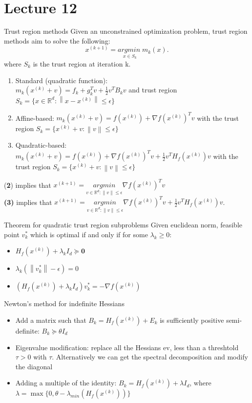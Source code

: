 \documentclass[a4paper]{article}
\begin{document}
\section{Lecture 12}
\begin{subbox}{Trust region methods}
    Given an unconstrained optimization problem, trust region methods aim to solve the following:
    \[
    x^{(k+1)} = \underset{x\in S_k}{argmin \;} m_k(x)
    .\] where $S_k$ is the trust region at iteration k.  
\end{subbox}
\begin{enumerate}
    \item Standard (quadratic function):\\
    $m_k(x^{(k)} + v) = f_k + g_k^Tv + \frac{1}{2}v^T B_k v$ and trust region $S_k = \{x\in \mathbb{R}^d : \left\lVert x-x^{(k)}\right\rVert \leq \epsilon \}$
    \item Affine-based: $m_k(x^{(k)} + v) = f(x^{(k)}) + \nabla f(x^{(k)})^T v$ with the trust region $S_k = \{x^{(k)} + v: \left\lVert v\right\rVert \leq \epsilon \}$ 
    \item Quadratic-based: $m_k(x^{(k)} + v) = f(x^{(k)}) + \nabla f(x^{(k)})^T v + \frac{1}{2}v^T H_f(x^{(k)})v$ with the trust region $S_k = \{x^{(k)} + v: \left\lVert v\right\rVert \leq \epsilon \}$
\end{enumerate}
(\textbf{2}) implies that $x^{(k+1)} = \underset{v\in \mathbb{R}^d: \left\lVert v\right\rVert \leq \epsilon}{argmin}
\nabla f(x^{(k)})^Tv$\\ 
\textbf{(3)}  implies that $x^{(k+1)} = \underset{v\in \mathbb{R}^d: \left\lVert v\right\rVert \leq \epsilon}{argmin} \nabla f(x^{(k)})^T v + \frac{1}{2}v^T H_f(x^{(k)})v $. 

\begin{mainbox}{Theorem for quadratic trust region subproblems}
    Given euclidean norm, feasible point $v_k^*$ which is optimal if and only if for some $\lambda_k \geq 0:$
    \begin{itemize}
        \item $H_f(x^{(k)}) + \lambda_k I_d \succeq \textbf{0} $
        \item $\lambda_k(\left\lVert v_k^*\right\rVert - \epsilon) = 0$
        \item $(H_f(x^{(k)}) + \lambda_k I_d)v_k^* = -\nabla f(x^{(k)})$  
    \end{itemize}
\end{mainbox}

\begin{mainbox}{Newton's method for indefinite Hessians}
    \begin{itemize}
    \item Add a matrix such that $B_k = H_f(x^{(k)}) + E_k$ is sufficiently positive semi-definite: $B_k \succeq \theta I_d$ 
    \item Eigenvalue modification: replace all the Hessians ev, less than a threshtold $\tau > 0$ with $\tau$. Alternatively we can get the spectral decomposition and modify the diagonal
    \item Adding a multiple of the identity: $B_k = H_f(x^{(k)}) + \lambda I_d$, where $\lambda = \max\{0, \theta-\lambda_{min}(H_f(x^{(k)}))\}$  
    \end{itemize}
\end{mainbox}
\end{document}
